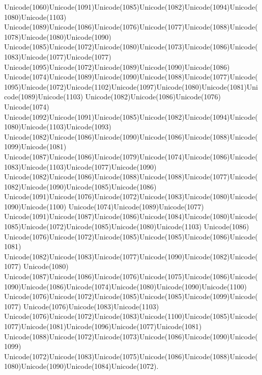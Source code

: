 \documentclass[a4paper,11pt]{report}
\begin{document}
{{{\begin{Verbatim}[commandchars=!@|,fontsize=\small,frame=single,label=Пример]
\end{Verbatim}
 Unicode(1060)Unicode(1091)Unicode(1085)Unicode(1082)Unicode(1094)Unicode(1080)Unicode(1103)
Unicode(1089)Unicode(1086)Unicode(1076)Unicode(1077)Unicode(1088)Unicode(1078)Unicode(1080)Unicode(1090)
Unicode(1085)Unicode(1072)Unicode(1080)Unicode(1073)Unicode(1086)Unicode(1083)Unicode(1077)Unicode(1077)
Unicode(1095)Unicode(1072)Unicode(1089)Unicode(1090)Unicode(1086)
Unicode(1074)Unicode(1089)Unicode(1090)Unicode(1088)Unicode(1077)Unicode(1095)Unicode(1072)Unicode(1102)Unicode(1097)Unicode(1080)Unicode(1081)Unicode(1089)Unicode(1103)
Unicode(1082)Unicode(1086)Unicode(1076) Unicode(1074)
Unicode(1092)Unicode(1091)Unicode(1085)Unicode(1082)Unicode(1094)Unicode(1080)Unicode(1103)Unicode(1093)
Unicode(1082)Unicode(1086)Unicode(1090)Unicode(1086)Unicode(1088)Unicode(1099)Unicode(1081)
Unicode(1087)Unicode(1086)Unicode(1079)Unicode(1074)Unicode(1086)Unicode(1083)Unicode(1103)Unicode(1077)Unicode(1090)
Unicode(1082)Unicode(1086)Unicode(1088)Unicode(1088)Unicode(1077)Unicode(1082)Unicode(1090)Unicode(1085)Unicode(1086)
Unicode(1091)Unicode(1076)Unicode(1072)Unicode(1083)Unicode(1080)Unicode(1090)Unicode(1100)
Unicode(1074)Unicode(1089)Unicode(1077)
Unicode(1091)Unicode(1087)Unicode(1086)Unicode(1084)Unicode(1080)Unicode(1085)Unicode(1072)Unicode(1085)Unicode(1080)Unicode(1103)
Unicode(1086)
Unicode(1076)Unicode(1072)Unicode(1085)Unicode(1085)Unicode(1086)Unicode(1081)
Unicode(1082)Unicode(1083)Unicode(1077)Unicode(1090)Unicode(1082)Unicode(1077)
Unicode(1080)
Unicode(1087)Unicode(1086)Unicode(1076)Unicode(1075)Unicode(1086)Unicode(1090)Unicode(1086)Unicode(1074)Unicode(1080)Unicode(1090)Unicode(1100)
Unicode(1076)Unicode(1072)Unicode(1085)Unicode(1085)Unicode(1099)Unicode(1077)
Unicode(1076)Unicode(1083)Unicode(1103)
Unicode(1076)Unicode(1072)Unicode(1083)Unicode(1100)Unicode(1085)Unicode(1077)Unicode(1081)Unicode(1096)Unicode(1077)Unicode(1081)
Unicode(1088)Unicode(1072)Unicode(1073)Unicode(1086)Unicode(1090)Unicode(1099)
Unicode(1072)Unicode(1083)Unicode(1075)Unicode(1086)Unicode(1088)Unicode(1080)Unicode(1090)Unicode(1084)Unicode(1072). }

 }

 }

 
\end{document}
